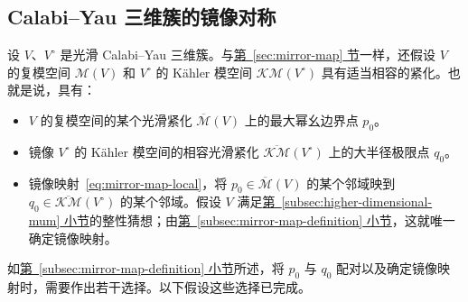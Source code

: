 \subsection{Calabi--Yau 三维簇的镜像对称}\label{subsec:threefold-mirror-symmetry}
设 $V$、$V^\circ$ 是光滑 Calabi--Yau 三维簇。与\hyperref[sec:mirror-map]{第~\ref*{sec:mirror-map} 节}一样，还假设 $V$ 的复模空间 $\mathcal M(V)$ 和 $V^\circ$ 的 Kähler 模空间 $\mathcal{KM}(V^\circ)$ 具有适当相容的紧化。也就是说，具有：
\begin{itemize}
\item $V$ 的复模空间的某个光滑紧化 $\overline{\mathcal M}(V)$ 上的最大幂幺边界点 $p_0$。
\item 镜像 $V^\circ$ 的 Kähler 模空间的相容光滑紧化 $\overline{\mathcal{KM}}(V^\circ)$ 上的大半径极限点 $q_0$。
\item 镜像映射~\eqref{eq:mirror-map-local}，将 $p_0\in\overline{\mathcal M}(V)$ 的某个邻域映到 $q_0\in\overline{\mathcal{KM}}(V^\circ)$ 的某个邻域。假设 $V$ 满足\hyperref[subsec:higher-dimensional-mum]{第~\ref*{subsec:higher-dimensional-mum} 小节}的整性猜想；由\hyperref[subsec:mirror-map-definition]{第~\ref*{subsec:mirror-map-definition} 小节}，这就唯一确定镜像映射。
\end{itemize}
如\hyperref[subsec:mirror-map-definition]{第~\ref*{subsec:mirror-map-definition} 小节}所述，将 $p_0$ 与 $q_0$ 配对以及确定镜像映射时，需要作出若干选择。以下假设这些选择已完成。

